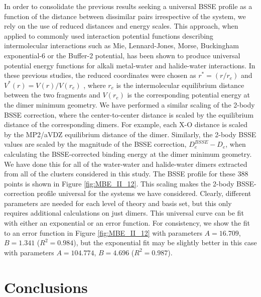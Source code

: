 \documentclass[11pt, proquest]{uwthesis}[2020/02/24]
\let\ce\ch
\begin{document}


\par In order to consolidate the previous results seeking a universal BSSE profile as a function of the distance between dissimilar pairs irrespective of the system, we rely on the use of reduced distances and energy scales. This approach, when applied to commonly used interaction potential functions describing intermolecular interactions such as Mie, Lennard-Jones, Morse, Buckingham exponential-6 or the Buffer-2 potential, has been shown to produce universal potential energy functions for alkali metal-water and halide-water interactions.\autocite{werhahn_universal_2014,werhahn_new_2015,xantheas_universal_2014}  In these previous studies, the reduced coordinates were chosen as $r^*=(r/r_e)$ and $V^*(r)=V(r)/V(r_e)$ , where $r_e$ is the intermolecular equilibrium distance between the two fragments and $V(r_e)$ is the corresponding potential energy at the dimer minimum geometry. We have performed a similar scaling of the 2-body BSSE correction, where the center-to-center distance is scaled by the equilibrium distance of the corresponding dimers. For example, each X-O distance is scaled by the MP2/aVDZ equilibrium distance of the \ce{X^-(H2O)} dimer. Similarly, the 2-body BSSE values are scaled by the magnitude of the BSSE correction, $D_e^{BSSE}-D_e$, when calculating the BSSE-corrected binding energy at the dimer minimum geometry. We have done this for all of the water-water and halide-water dimers extracted from all of the clusters considered in this study. The BSSE profile for these 388 points is shown in Figure \ref{fig:MBE_II_12}. This scaling makes the 2-body BSSE-correction profile universal for the systems we have considered. Clearly, different parameters are needed for each level of theory and basis set, but this only requires additional calculations on just dimers. This universal curve can be fit with either an exponential or an error function. For consistency, we show the fit to an error function in Figure \ref{fig:MBE_II_12} with parameters $A = 16.709$, $B = 1.341$ ($R^2 = 0.984$), but the exponential fit may be slightly better in this case with parameters $A = 104.774$, $B = 4.696$ ($R^2 = 0.987$).

\section{Conclusions} \label{sec:MBE_2_sec_4}
\end{document}
